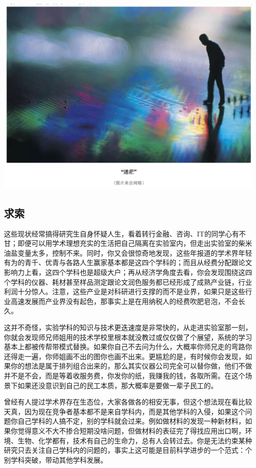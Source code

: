 \documentclass[]{book}
\begin{document}
\includegraphics[width=6.67in]{images/hhcs4}

\subsection{求索}

这些现状经常搞得研究生自身怀疑人生，看着转行金融、咨询、IT的同学心有不甘；即便可以用学术理想充实的生活把自己隔离在实验室内，但走出实验室的柴米油盐变量太多，控制不来。同时，你又会很惊奇地发现，这些年报道的学术界年轻有为的青千、优青与各路人生赢家基本都是这四个学科的；而且从经费分配跟论文影响力上看，这四个学科也是超级大户；再从经济学角度去看，你会发现围绕这四个学科的仪器、耗材甚至样品测定跟论文润色服务都已经形成了成熟产业链，行业利润十分惊人。注意，这些产业是对科研进行支撑的而不是业界，如果只是这些行业高速发展而产业界没有起色，那事实上是在用纳税人的经费吹肥皂泡，不会长久。

这并不奇怪，实验学科的知识与技术更迭速度是非常快的，从走进实验室那一刻，你就会发现师兄师姐用的技术学校里根本就没教过或仅仅做了个展望，系统的学习基本上都被传帮带模式替换。如果你自己不去问为什么，大概率你师兄走的弯路你还得走一遍，你师姐画不出的图你也画不出来。更尴尬的是，有时候你会发现，如果你的想法是属于排列组合出来的，那么其实仪器公司完全可以替你做，他们不做并不是不会，而是等着收服务费，你发你的纸，我赚我的钱，各取所需。在这个场景下如果还没意识到自己的民工本质，那大概率是要做一辈子民工的。

曾经有人提过学术界存在生态位，大家各做各的相安无事，但这个想法现在看比较天真，因为现在竞争者基本都不是来自学科内，而是其他学科的入侵，如果这个问题你自己学科的人搞不定，别的学科就会过来。例如做材料的发现一种新材料，如果你觉得意义不大不掺合短期没啥问题，但做材料的表征完了得找应用出口啊，环境、生物、化学都有，技术有自己的生命力，总有人会转过去。你是无法约束某种研究只去关注自己学科内的问题的，事实上这可能是目前科学进步的一个范式：个别学科突破，带动其他学科发展。
\end{document}
